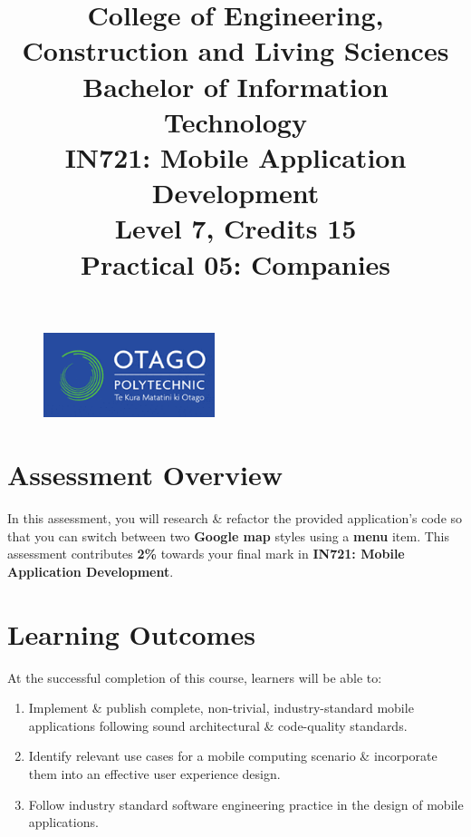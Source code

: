 \documentclass{article}
\author{}
\begin{document}
\begin{figure}
    \centering
    \includegraphics[width=50mm]{../../resources/img/logo.png}
\end{figure}

\title{College of Engineering, Construction and Living Sciences\\Bachelor of Information Technology\\IN721: Mobile Application Development\\Level 7, Credits 15\\\textbf{Practical 05: Companies}}
\date{}
\maketitle

\section*{Assessment Overview}
In this assessment, you will research \& refactor the provided application's code so that you can switch between two \textbf{Google map} styles using a \textbf{menu} item. This assessment contributes \textbf{2\%} towards your final mark in \textbf{IN721: Mobile Application Development}.

\section*{Learning Outcomes}
At the successful completion of this course, learners will be able to: 
\begin{enumerate}
	\item Implement \& publish complete, non-trivial, industry-standard mobile applications following sound architectural \& code-quality standards.
	\item Identify relevant use cases for a mobile computing scenario \& incorporate them into an effective user experience design.
	\item Follow industry standard software engineering practice in the design of mobile applications.
\end{enumerate} 
\end{document}
